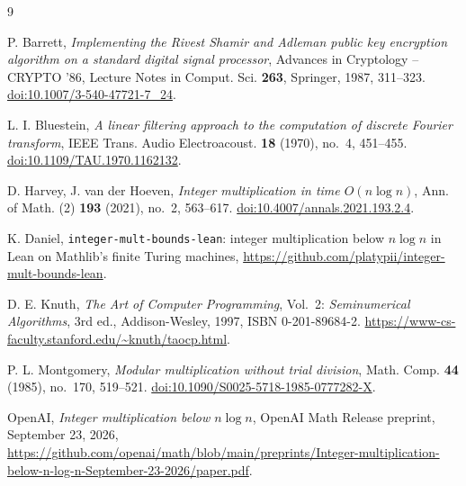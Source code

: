 \documentclass[11pt]{amsart}
\begin{document}
\begin{thebibliography}{9}\raggedright

 P. Barrett,
\emph{Implementing the Rivest Shamir and Adleman public key encryption algorithm on a standard
digital signal processor}, Advances in Cryptology -- CRYPTO '86, Lecture Notes in Comput.
Sci. \textbf{263}, Springer, 1987, 311--323.
\href{https://doi.org/10.1007/3-540-47721-7_24}{doi:10.1007/3-540-47721-7\_24}.

 L. I. Bluestein,
\emph{A linear filtering approach to the computation of discrete Fourier transform},
IEEE Trans. Audio Electroacoust. \textbf{18} (1970), no.~4, 451--455.
\href{https://doi.org/10.1109/TAU.1970.1162132}{doi:10.1109/TAU.1970.1162132}.

 D. Harvey, J. van der Hoeven,
\emph{Integer multiplication in time $O(n \log n)$}, Ann. of Math. (2) \textbf{193} (2021),
no.~2, 563--617.
\href{https://doi.org/10.4007/annals.2021.193.2.4}{doi:10.4007/annals.2021.193.2.4}.

 K. Daniel, \texttt{integer-mult-bounds-lean}: integer multiplication
below $n \log n$ in Lean on Mathlib's finite Turing machines,
\url{https://github.com/platypii/integer-mult-bounds-lean}.

 D. E. Knuth,
\emph{The Art of Computer Programming}, Vol.~2: \emph{Seminumerical Algorithms}, 3rd ed.,
Addison-Wesley, 1997, ISBN 0-201-89684-2.
\url{https://www-cs-faculty.stanford.edu/~knuth/taocp.html}.

 P. L. Montgomery,
\emph{Modular multiplication without trial division}, Math. Comp. \textbf{44} (1985),
no.~170, 519--521.
\href{https://doi.org/10.1090/S0025-5718-1985-0777282-X}{doi:10.1090/S0025-5718-1985-0777282-X}.

 OpenAI,
\emph{Integer multiplication below $n \log n$}, OpenAI Math Release preprint, September 23, 2026,
\url{https://github.com/openai/math/blob/main/preprints/Integer-multiplication-below-n-log-n-September-23-2026/paper.pdf}.

\end{thebibliography}
\end{document}
